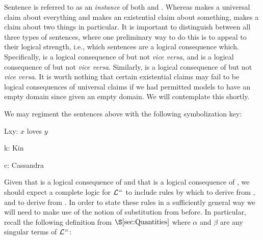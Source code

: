 Sentence  is referred to as an \textit{instance} of both  and . %
Whereas  makes a universal claim about everything and  makes an existential claim about something,  makes a claim about two things in particular.
It is important to distinguish between all three types of sentences, where one preliminary way to do this is to appeal to their logical strength, i.e., which sentences are a logical consequence which.
Specifically,  is a logical consequence of  but not \textit{vice versa}, and  is a logical consequence of  but not \textit{vice versa}.
Similarly,  is a logical consequence of  but not \textit{vice versa}.
It is worth nothing that certain existential claims may fail to be logical consequences of universal claims if we had permitted models to have an empty domain since given an empty domain. %
We will contemplate this shortly.


We may regiment the sentences above with the following symbolization key:

\begin{multicols}{2}
  \begin{ekey}
    \item[Lxy:] $x$ loves $y$ 
    \item[k:] Kin
    \item[c:] Cassandra
  \end{ekey}

  \columnbreak

  \begin{earg} \label{KCstrength}
  \end{earg}
\end{multicols}

Given that  is a logical consequence of  and that  is a logical consequence of , we should expect a complete logic for $\mathcal{L}^{=}$ to include rules by which to derive  from , and to derive  from . 
In order to state these rules in a sufficiently general way we will need to make use of the notion of substitution from before.
In particular, recall the following definition from $\S\ref{sec:Quantities}$ where $\alpha$ and $\beta$ are any singular terms of $\mathcal{L}^{=}$:


